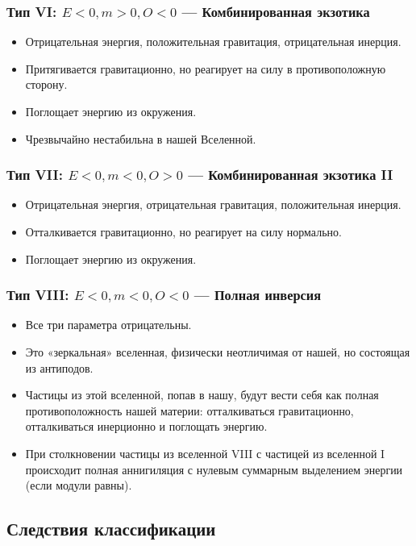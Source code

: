 \documentclass[12pt,a4paper]{article}
\begin{document}
\subsubsection{Тип VI: $E < 0, m > 0, O < 0$ --- Комбинированная экзотика}
\begin{itemize}
    \item Отрицательная энергия, положительная гравитация, отрицательная инерция.
    \item Притягивается гравитационно, но реагирует на силу в противоположную сторону.
    \item Поглощает энергию из окружения.
    \item Чрезвычайно нестабильна в нашей Вселенной.
\end{itemize}

\subsubsection{Тип VII: $E < 0, m < 0, O > 0$ --- Комбинированная экзотика II}
\begin{itemize}
    \item Отрицательная энергия, отрицательная гравитация, положительная инерция.
    \item Отталкивается гравитационно, но реагирует на силу нормально.
    \item Поглощает энергию из окружения.
\end{itemize}

\subsubsection{Тип VIII: $E < 0, m < 0, O < 0$ --- Полная инверсия}
\begin{itemize}
    \item Все три параметра отрицательны.
    \item Это «зеркальная» вселенная, физически неотличимая от нашей, но состоящая из антиподов.
    \item Частицы из этой вселенной, попав в нашу, будут вести себя как полная противоположность нашей материи: отталкиваться гравитационно, отталкиваться инерционно и поглощать энергию.
    \item При столкновении частицы из вселенной VIII с частицей из вселенной I происходит полная аннигиляция с нулевым суммарным выделением энергии (если модули равны).
\end{itemize}

\subsection{Следствия классификации}
\end{document}
